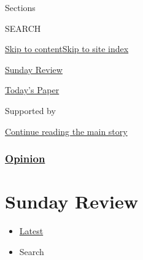 Sections

SEARCH

\protect\hyperlink{site-content}{Skip to
content}\protect\hyperlink{site-index}{Skip to site index}

\href{https://www.nytimes.com/section/opinion/sunday}{Sunday Review}

\href{https://myaccount.nytimes.com/auth/login?response_type=cookie\&client_id=vi}{}

\href{https://www.nytimes.com/section/todayspaper}{Today's Paper}

Supported by

\protect\hyperlink{after-sponsor}{Continue reading the main story}

\hypertarget{opinion}{%
\subsubsection{\texorpdfstring{\href{/section/opinion}{Opinion}}{Opinion}}\label{opinion}}

\hypertarget{sunday-review}{%
\section{Sunday Review}\label{sunday-review}}

\begin{itemize}
\tightlist
\item
  \protect\hyperlink{stream-panel}{Latest}
\item
  Search
\end{itemize}

